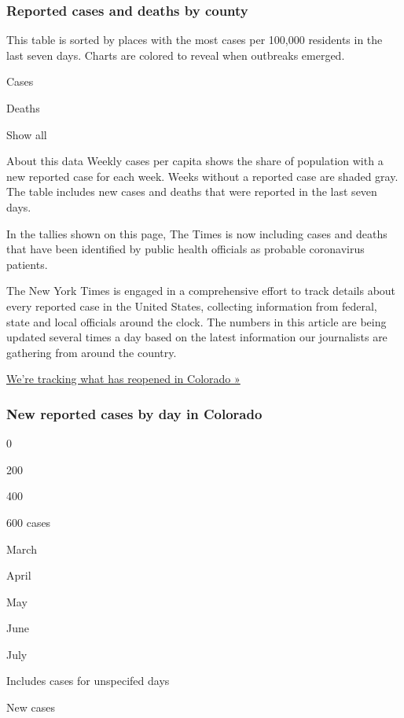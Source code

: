 \hypertarget{reported-cases-and-deaths-by-county}{%
\subsubsection{Reported cases and deaths by
county}\label{reported-cases-and-deaths-by-county}}

This table is sorted by places with the most cases per 100,000 residents
in the last seven days. Charts are colored to reveal when outbreaks
emerged.

Cases

Deaths

Show all

About this data Weekly cases per capita shows the share of population
with a new reported case for each week. Weeks without a reported case
are shaded gray. The table includes new cases and deaths that were
reported in the last seven days.

In the tallies shown on this page, The Times is now including cases and
deaths that have been identified by public health officials as probable
coronavirus patients.

The New York Times is engaged in a comprehensive effort to track details
about every reported case in the United States, collecting information
from federal, state and local officials around the clock. The numbers in
this article are being updated several times a day based on the latest
information our journalists are gathering from around the country.

\href{https://www.nytimes.com/interactive/2020/us/states-reopen-map-coronavirus.html}{We're
tracking what has reopened in Colorado »}

\hypertarget{new-reported-cases-by-day-in-colorado}{%
\subsubsection{New reported cases by day in
Colorado}\label{new-reported-cases-by-day-in-colorado}}

0

200

400

600 cases

March

April

May

June

July

Includes cases for unspecifed days

New cases

